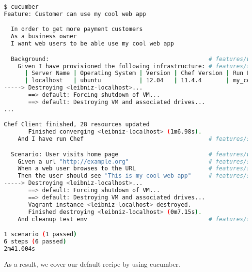 \begin{lstlisting}[language=Bash,label=lst:testing-cucumber-spec7]
$ cucumber
Feature: Customer can use my cool web app

  In order to get more payment customers
  As a business owner
  I want web users to be able use my cool web app

  Background:                                              # features/working_web_page.feature:7
    Given I have provisioned the following infrastructure: # features/step_definitions/working_web_page.rb:1
      | Server Name | Operating System | Version | Chef Version | Run List             |
      | localhost   | ubuntu           | 12.04   | 11.4.4       | my_cool_app::default |
-----> Destroying <leibniz-localhost>...
       ==> default: Forcing shutdown of VM...
       ==> default: Destroying VM and associated drives...
...

Chef Client finished, 28 resources updated
       Finished converging <leibniz-localhost> (1m6.98s).
    And I have run Chef                                    # features/step_definitions/working_web_page.rb:5

  Scenario: User visits home page                          # features/working_web_page.feature:14
    Given a url "http://example.org"                       # features/step_definitions/working_web_page.rb:10
    When a web user browses to the URL                     # features/step_definitions/working_web_page.rb:14
    Then the user should see "This is my cool web app"     # features/step_definitions/working_web_page.rb:21
-----> Destroying <leibniz-localhost>...
       ==> default: Forcing shutdown of VM...
       ==> default: Destroying VM and associated drives...
       Vagrant instance <leibniz-localhost> destroyed.
       Finished destroying <leibniz-localhost> (0m7.15s).
    And cleanup test env                                   # features/step_definitions/working_web_page.rb:25

1 scenario (1 passed)
6 steps (6 passed)
2m41.004s
\end{lstlisting}

As a result, we cover our default recipe by using cucumber.
